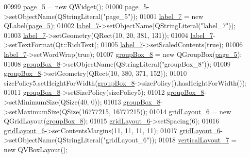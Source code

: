 \begin{DoxyCode}
00999         \hyperlink{a00080_a421261d29369be60b551aabe8b097597}{page\_5} = \textcolor{keyword}{new} QWidget();
01000         \hyperlink{a00080_a421261d29369be60b551aabe8b097597}{page\_5}->setObjectName(QStringLiteral(\textcolor{stringliteral}{"page\_5"}));
01001         \hyperlink{a00080_a13936e6f18b1c90402b3c7a3c92b6cdb}{label\_7} = \textcolor{keyword}{new} QLabel(\hyperlink{a00080_a421261d29369be60b551aabe8b097597}{page\_5});
01002         \hyperlink{a00080_a13936e6f18b1c90402b3c7a3c92b6cdb}{label\_7}->setObjectName(QStringLiteral(\textcolor{stringliteral}{"label\_7"}));
01003         \hyperlink{a00080_a13936e6f18b1c90402b3c7a3c92b6cdb}{label\_7}->setGeometry(QRect(10, 20, 381, 131));
01004         \hyperlink{a00080_a13936e6f18b1c90402b3c7a3c92b6cdb}{label\_7}->setTextFormat(Qt::RichText);
01005         \hyperlink{a00080_a13936e6f18b1c90402b3c7a3c92b6cdb}{label\_7}->setScaledContents(\textcolor{keyword}{true});
01006         \hyperlink{a00080_a13936e6f18b1c90402b3c7a3c92b6cdb}{label\_7}->setWordWrap(\textcolor{keyword}{true});
01007         \hyperlink{a00080_a1a1fe5ec77ba52ba39a16db29ff0f91a}{groupBox\_8} = \textcolor{keyword}{new} QGroupBox(\hyperlink{a00080_a421261d29369be60b551aabe8b097597}{page\_5});
01008         \hyperlink{a00080_a1a1fe5ec77ba52ba39a16db29ff0f91a}{groupBox\_8}->setObjectName(QStringLiteral(\textcolor{stringliteral}{"groupBox\_8"}));
01009         \hyperlink{a00080_a1a1fe5ec77ba52ba39a16db29ff0f91a}{groupBox\_8}->setGeometry(QRect(10, 380, 371, 152));
01010         sizePolicy5.setHeightForWidth(\hyperlink{a00080_a1a1fe5ec77ba52ba39a16db29ff0f91a}{groupBox\_8}->sizePolicy().hasHeightForWidth());
01011         \hyperlink{a00080_a1a1fe5ec77ba52ba39a16db29ff0f91a}{groupBox\_8}->setSizePolicy(sizePolicy5);
01012         \hyperlink{a00080_a1a1fe5ec77ba52ba39a16db29ff0f91a}{groupBox\_8}->setMinimumSize(QSize(40, 0));
01013         \hyperlink{a00080_a1a1fe5ec77ba52ba39a16db29ff0f91a}{groupBox\_8}->setMaximumSize(QSize(16777215, 16777215));
01014         \hyperlink{a00080_ad113cf7b76aaf178473555bdf64ff035}{gridLayout\_6} = \textcolor{keyword}{new} QGridLayout(\hyperlink{a00080_a1a1fe5ec77ba52ba39a16db29ff0f91a}{groupBox\_8});
01015         \hyperlink{a00080_ad113cf7b76aaf178473555bdf64ff035}{gridLayout\_6}->setSpacing(6);
01016         \hyperlink{a00080_ad113cf7b76aaf178473555bdf64ff035}{gridLayout\_6}->setContentsMargins(11, 11, 11, 11);
01017         \hyperlink{a00080_ad113cf7b76aaf178473555bdf64ff035}{gridLayout\_6}->setObjectName(QStringLiteral(\textcolor{stringliteral}{"gridLayout\_6"}));
01018         \hyperlink{a00080_a7b66d5d6ab55f3977317359d09a42345}{verticalLayout\_7} = \textcolor{keyword}{new} QVBoxLayout();

\end{DoxyCode}

